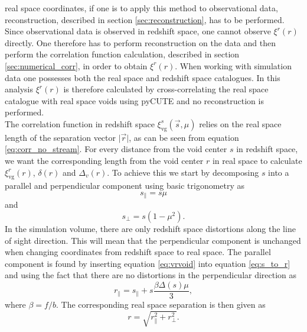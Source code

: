 real space coordinates, if one is to apply this method to observational data,
reconstruction, described in section \ref{sec:reconstruction}, has to be performed. Since observational data is observed in
redshift space, one cannot observe $\xi^r(r)$ directly. One therefore has to
perform reconstruction on the data and then perform the correlation function
calculation, described in section \ref{sec:numerical_corr}, in order to obtain
$\xi^r(r)$. When working with simulation data one possesses both the real space and redshift space catalogues. In this analysis $\xi^r(r)$ is therefore calculated by cross-correlating the real space catalogue with real space voids using pyCUTE and no reconstruction is performed. 
\\\indent
The correlation function in redshift space $\xi^s_{\mathrm{vg}}(\vec{s},\mu)$
relies on the real space length of the separation vector $\vert\vec{r}\vert$, as
can be seen from equation \ref{eq:corr_no_stream}. For every distance from the void center $s$ in
redshift space, we want the corresponding length from the void center $r$ in
real space to calculate $\xi^r_{\mathrm{vg}}(r)$, $\delta(r)$ and $\Delta_v(r)$.
To achieve this we start by decomposing $s$ into a parallel and perpendicular
component using basic trigonometry as
\begin{equation}
    s_\parallel=s\mu
\end{equation}
and
\begin{equation}
    s_\perp=s(1-\mu^2).
\end{equation}
In the simulation volume, there are only redshift space distortions along the line
of sight direction. This will mean that the perpendicular component is unchanged
when changing coordinates from redshift space to real space. The parallel
component is found by inserting equation \ref{eq:vrvoid} into equation \ref{eq:s_to_r} and using the fact that there are no distortions in the perpendicular direction as
\begin{equation}
    r_\parallel=s_\parallel + s\frac{\beta\Delta(s)\mu}{3},
\end{equation}
where $\beta=f/b$.
The corresponding real space separation is then given as
\begin{equation}
    r=\sqrt{r_\parallel^2+r_\perp^2}.
\end{equation}
